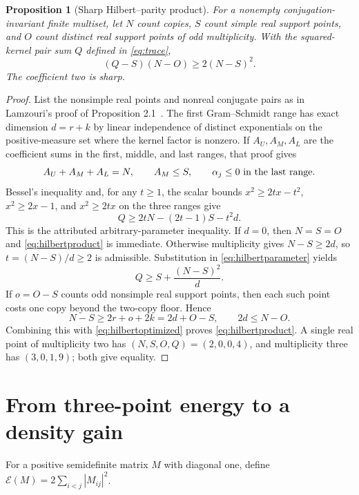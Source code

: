\documentclass[11pt]{article}
\newtheorem{proposition}[theorem]{Proposition}
\theoremstyle{remark}
\newcommand{\cE}{\mathcal E}
\begin{document}
\begin{proposition}[Sharp Hilbert--parity product]\label{prop:hilbertproduct}
For a nonempty conjugation-invariant finite multiset, let $N$ count copies,
$S$ count simple real support points, and $O$ count distinct real support
points of odd multiplicity. With the squared-kernel pair sum $Q$ defined in
\eqref{eq:trace},
\begin{equation}\label{eq:hilbertproduct}
 (Q-S)(N-O)\ge2(N-S)^2.
\end{equation}
The coefficient two is sharp.
\end{proposition}
\begin{proof}
List the nonsimple real points and nonreal conjugate pairs as in Lamzouri's
proof of Proposition 2.1~\cite{Lamzouri}. The first Gram--Schmidt range has
exact dimension $d=r+k$ by linear independence of distinct exponentials on
the positive-measure set where the kernel factor is nonzero. If
$A_U,A_M,A_L$ are the coefficient sums in the first, middle, and last ranges,
that proof gives
\[
 A_U+A_M+A_L=N,\qquad A_M\le S,
 \qquad \alpha_j\le0\ \hbox{in the last range}.
\]
Bessel's inequality and, for any $t\ge1$, the scalar bounds
$x^2\ge2tx-t^2$, $x^2\ge2x-1$, and $x^2\ge2tx$ on the three ranges give
\begin{equation}\label{eq:hilbertparameter}
 Q\ge2tN-(2t-1)S-t^2d.
\end{equation}
This is the attributed arbitrary-parameter inequality. If $d=0$, then
$N=S=O$ and \eqref{eq:hilbertproduct} is immediate. Otherwise multiplicity
gives $N-S\ge2d$, so $t=(N-S)/d\ge2$ is admissible. Substitution in
\eqref{eq:hilbertparameter} yields
\begin{equation}\label{eq:hilbertoptimized}
 Q\ge S+\frac{(N-S)^2}{d}.
\end{equation}
If $o=O-S$ counts odd nonsimple real support points, then each such point
costs one copy beyond the two-copy floor. Hence
\[
 N-S\ge2r+o+2k=2d+O-S,
 \qquad 2d\le N-O.
\]
Combining this with \eqref{eq:hilbertoptimized} proves
\eqref{eq:hilbertproduct}. A single real point of multiplicity two has
$(N,S,O,Q)=(2,0,0,4)$, and multiplicity three has $(3,0,1,9)$; both give
equality.
\end{proof}

\section{From three-point energy to a density gain}

For a positive semidefinite matrix $M$ with diagonal one, define
$\cE(M)=2\sum_{i<j}|M_{ij}|^2$.
\end{document}
